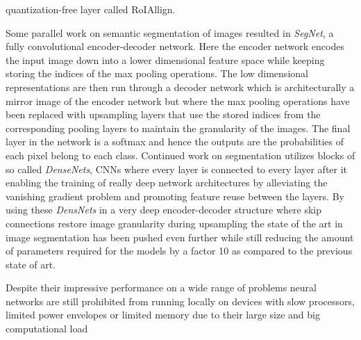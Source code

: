 \documentclass[11pt]{article}
\newcommand{\bibentry}[1]{\cite{#1}}
\begin{document}
quantization-free layer called RoIAllign.

Some parallel work on semantic segmentation of images resulted in \emph{SegNet}\bibentry{badrinarayanan2015segnet}, a fully convolutional encoder-decoder network. Here the encoder network encodes the input image down into a lower dimensional feature space while keeping storing the indices of the max pooling operations. The low dimensional representations are then run through a decoder network which is architecturally a mirror image of the encoder network but where the max pooling operations have been replaced with upsampling layers that use the stored indices from the corresponding pooling layers to maintain the granularity of the images. The final layer in the network is a softmax and hence the outputs are the probabilities of each pixel belong to each class.
Continued work on segmentation utilizes blocks of so called \emph{DenseNets}\bibentry{huang2017densely}, CNNs where every layer is connected to every layer after it enabling the training of really deep network architectures by alleviating the vanishing gradient problem and promoting feature reuse between the layers. By using these \emph{DensNets} in a very deep encoder-decoder structure where skip connections restore image granularity during upsampling the state of the art in image segmentation has been pushed even further \bibentry{jegou2017one} while still reducing the amount of parameters required for the models by a factor 10 as compared to the previous state of art.

Despite their impressive performance on a wide range of problems neural networks are still prohibited from running locally on devices with slow processors, limited power envelopes or limited memory due to their large size and big computational load 


 
\end{document}
